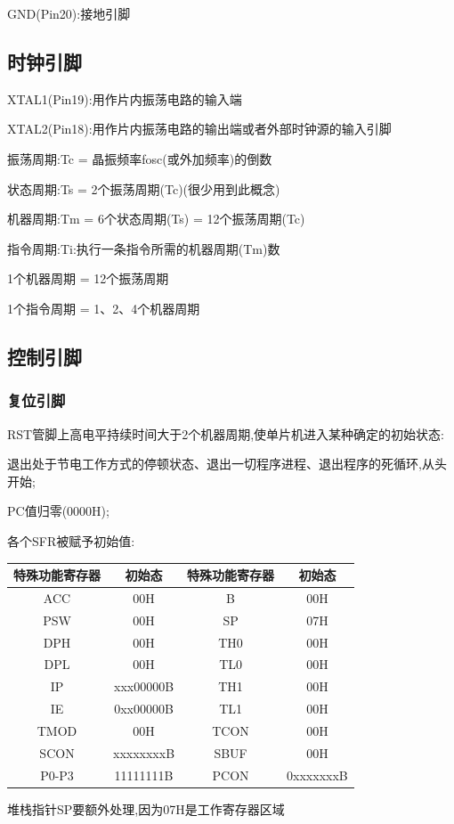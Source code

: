 \documentclass[12pt,a4paper,oneside]{ctexart}
\begin{document}
GND(Pin20):接地引脚

\subsection{时钟引脚}
XTAL1(Pin19):用作片内振荡电路的输入端

XTAL2(Pin18):用作片内振荡电路的输出端或者外部时钟源的输入引脚

振荡周期:Tc = 晶振频率fosc(或外加频率)的倒数

状态周期:Ts = 2个振荡周期(Tc)(很少用到此概念)

机器周期:Tm = 6个状态周期(Ts) = 12个振荡周期(Tc)

指令周期:Ti:执行一条指令所需的机器周期(Tm)数

1个机器周期 = 12个振荡周期

1个指令周期 = 1、2、4个机器周期

\subsection{控制引脚}
\subsubsection{复位引脚}
RST管脚上高电平持续时间大于2个机器周期,使单片机进入某种确定的初始状态:

退出处于节电工作方式的停顿状态、退出一切程序进程、退出程序的死循环,从头开始;

PC值归零(0000H);

各个SFR被赋予初始值:
\begin{table}[H]
    \centering
    \begin{tabular}{|c|c|c|c|}
    \hline
    特殊功能寄存器 & 初始态       & 特殊功能寄存器 & 初始态       \\ \hline
    ACC     & 00H       & B       & 00H       \\ \hline
    PSW     & 00H       & SP      & 07H       \\ \hline
    DPH     & 00H       & TH0     & 00H       \\ \hline
    DPL     & 00H       & TL0     & 00H       \\ \hline
    IP      & xxx00000B & TH1     & 00H       \\ \hline
    IE      & 0xx00000B & TL1     & 00H       \\ \hline
    TMOD    & 00H       & TCON    & 00H       \\ \hline
    SCON    & xxxxxxxxB & SBUF    & 00H       \\ \hline
    P0-P3   & 11111111B & PCON    & 0xxxxxxxB \\ \hline
    \end{tabular}
\end{table}
堆栈指针SP要额外处理,因为07H是工作寄存器区域
\end{document}
